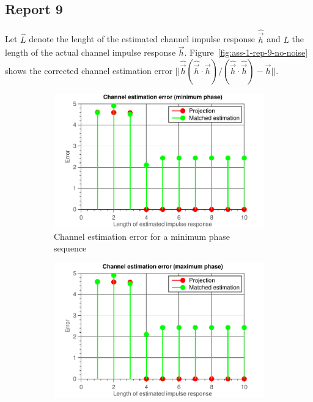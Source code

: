 \documentclass[11pt,titlepage]{report}
\begin{document}
\subsection{Report 9}
Let $\hat{L}$ denote the lenght of the estimated channel impulse response $\hat{\vec{h}}$ and $L$ the length of the actual channel impulse response $\vec{h}$. Figure~\ref{fig:ass-1-rep-9-no-noise} shows the corrected channel estimation error $||\hat{\vec{h}}(\hat{\vec{h}} \cdot \vec{h})/(\hat{\vec{h}} \cdot \hat{\vec{h}}) - \vec{h}||$.
\begin{figure}[H]
	\centering
	\begin{subfigure}{0.49\textwidth}
		\includegraphics[width=\textwidth]{../../deliverable-7-resources/figures/ass-1/report-8-9-10/report-9-no-noise/ass-1-report-9-minimum-phase.pdf}
		\caption{\centering Channel estimation error for a minimum phase sequence}
	\end{subfigure}
	\begin{subfigure}{0.49\textwidth}
		\includegraphics[width=\textwidth]{../../deliverable-7-resources/figures/ass-1/report-8-9-10/report-9-no-noise/ass-1-report-9-maximum-phase.pdf}

\end{subfigure}
\end{figure}
\end{document}
